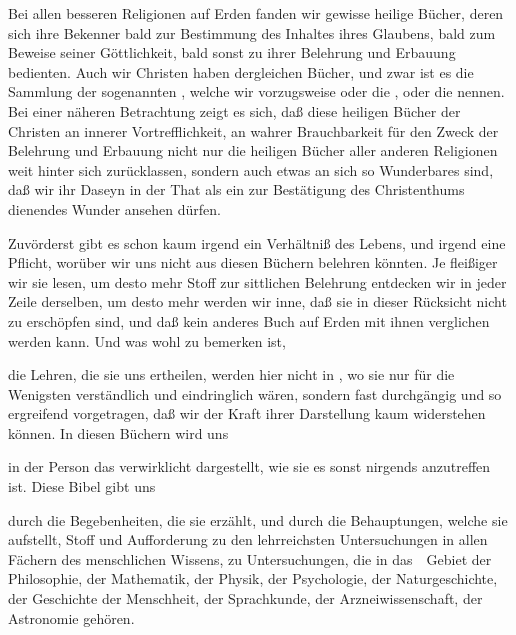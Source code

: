 \begin{aufza}
\item Bei allen besseren Religionen auf Erden fanden wir gewisse heilige Bücher, deren sich ihre Bekenner bald zur Bestimmung des Inhaltes ihres Glaubens, bald zum Beweise seiner Göttlichkeit, bald sonst zu ihrer Belehrung und Erbauung bedienten. Auch wir Christen haben dergleichen Bücher, und zwar ist es die Sammlung der sogenannten , welche wir vorzugsweise  oder die , oder die  nennen. Bei einer näheren Betrachtung zeigt es sich, daß diese heiligen Bücher der Christen an innerer Vortrefflichkeit, an wahrer Brauchbarkeit für den Zweck der Belehrung und Erbauung nicht nur die heiligen Bücher aller anderen Religionen weit hinter sich zurücklassen, sondern auch etwas an sich so Wunderbares sind, daß wir ihr Daseyn in der That als ein zur Bestätigung des Christenthums dienendes Wunder ansehen dürfen.
\begin{aufzb}
\item Zuvörderst gibt es schon kaum irgend ein Verhältniß des Lebens, und irgend eine Pflicht, worüber wir uns nicht aus diesen Büchern belehren könnten. Je fleißiger wir sie lesen, um desto mehr Stoff zur sittlichen Belehrung entdecken wir in jeder Zeile derselben, um desto mehr werden wir inne, daß sie in dieser Rücksicht nicht zu erschöpfen sind, und daß kein anderes Buch auf Erden mit ihnen verglichen werden kann. Und was wohl zu bemerken ist,
\item die Lehren, die sie uns ertheilen, werden hier nicht in , wo sie nur für die Wenigsten verständlich und eindringlich wären, sondern fast durchgängig  und so ergreifend vorgetragen, daß wir der Kraft ihrer Darstellung kaum widerstehen können. In diesen Büchern wird uns
\item in der Person  das  verwirklicht dargestellt, wie sie es sonst nirgends anzutreffen ist. Diese Bibel gibt uns
\item durch die Begebenheiten, die sie erzählt, und durch die Behauptungen, welche sie aufstellt, Stoff und Aufforderung zu den lehrreichsten Untersuchungen in allen Fächern des menschlichen Wissens, zu Untersuchungen, die in das~\ Gebiet der Philosophie, der Mathematik, der Physik, der Psychologie, der Naturgeschichte, der Geschichte der Menschheit, der Sprachkunde, der Arzneiwissenschaft, der Astronomie gehören.

\end{aufzb}
\end{aufza}

